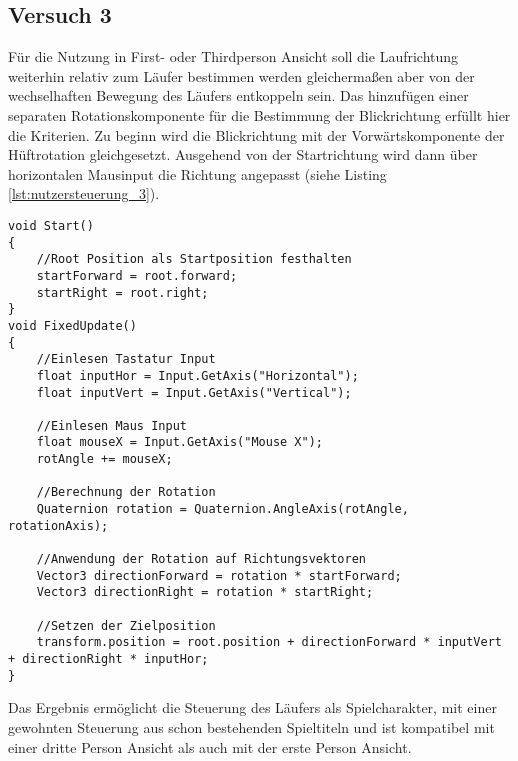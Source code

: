 \subsection{Versuch 3}
Für die Nutzung in First- oder Thirdperson Ansicht soll die Laufrichtung weiterhin relativ zum Läufer bestimmen werden gleichermaßen aber von der wechselhaften Bewegung des Läufers entkoppeln sein.
Das hinzufügen einer separaten Rotationskomponente für die Bestimmung der Blickrichtung erfüllt hier die Kriterien.
Zu beginn wird die Blickrichtung mit der Vorwärtskomponente der Hüftrotation gleichgesetzt. Ausgehend von der Startrichtung wird dann über horizontalen Mausinput die Richtung angepasst (siehe Listing \ref{lst:nutzersteuerung_3}).
\begin{lstlisting}[caption={Erweiterung der Nutzersteuerung mit separater Blickrichtung},captionpos=b,label={lst:nutzersteuerung_3}]
void Start()
{
    //Root Position als Startposition festhalten
    startForward = root.forward;
    startRight = root.right;
}
void FixedUpdate()
{
    //Einlesen Tastatur Input
    float inputHor = Input.GetAxis("Horizontal");
    float inputVert = Input.GetAxis("Vertical");

    //Einlesen Maus Input
    float mouseX = Input.GetAxis("Mouse X");
    rotAngle += mouseX;

    //Berechnung der Rotation
    Quaternion rotation = Quaternion.AngleAxis(rotAngle, rotationAxis);

    //Anwendung der Rotation auf Richtungsvektoren
    Vector3 directionForward = rotation * startForward;
    Vector3 directionRight = rotation * startRight;

    //Setzen der Zielposition
    transform.position = root.position + directionForward * inputVert + directionRight * inputHor;
}
\end{lstlisting}
Das Ergebnis ermöglicht die Steuerung des Läufers als Spielcharakter, mit einer gewohnten Steuerung aus schon bestehenden Spieltiteln und ist kompatibel mit einer dritte Person Ansicht als auch mit der erste Person Ansicht.